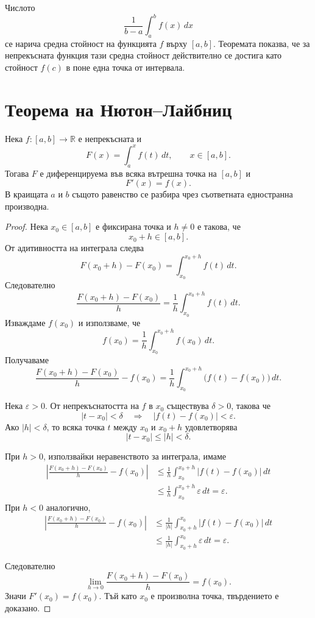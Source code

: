 Числото
\[
\frac{1}{b-a}\int_a^b f(x)\,dx
\]
се нарича средна стойност на функцията $f$ върху $[a,b]$. Теоремата показва, че за непрекъсната функция тази средна стойност действително се достига като стойност $f(c)$ в поне една точка от интервала.

\section{Теорема на Нютон--Лайбниц}\label{s:33.6}

\begin{keythm}
\label{thm:newtonleibniz}
Нека $f\colon[a,b]\to\mathbb{R}$ е непрекъсната и
\[
F(x)=\int_a^x f(t)\,dt,
\qquad x\in[a,b].
\]
Тогава $F$ е диференцируема във всяка вътрешна точка на $[a,b]$ и
\[
F'(x)=f(x).
\]
В краищата $a$ и $b$ същото равенство се разбира чрез съответната едностранна производна.
\end{keythm}

\begin{proof}
Нека $x_0\in[a,b]$ е фиксирана точка и $h\ne0$ е такова, че
\[
x_0+h\in[a,b].
\]
От адитивността на интеграла следва
\[
F(x_0+h)-F(x_0)
=
\int_{x_0}^{x_0+h}f(t)\,dt.
\]
Следователно
\[
\frac{F(x_0+h)-F(x_0)}{h}
=
\frac{1}{h}\int_{x_0}^{x_0+h}f(t)\,dt.
\]
Изваждаме $f(x_0)$ и използваме, че
\[
f(x_0)=\frac{1}{h}\int_{x_0}^{x_0+h}f(x_0)\,dt.
\]
Получаваме
\[
\frac{F(x_0+h)-F(x_0)}{h}-f(x_0)
=
\frac{1}{h}\int_{x_0}^{x_0+h}
\bigl(f(t)-f(x_0)\bigr)\,dt.
\]

Нека $\varepsilon>0$. От непрекъснатостта на $f$ в $x_0$ съществува $\delta>0$, такова че
\[
|t-x_0|<\delta
\quad\Longrightarrow\quad
|f(t)-f(x_0)|<\varepsilon.
\]
Ако $|h|<\delta$, то всяка точка $t$ между $x_0$ и $x_0+h$ удовлетворява
\[
|t-x_0|\leq |h|<\delta.
\]

При $h>0$, използвайки неравенството за интеграла, имаме
\begin{align*}
\left|
\frac{F(x_0+h)-F(x_0)}{h}-f(x_0)
\right|
&\leq
\frac{1}{h}
\int_{x_0}^{x_0+h}|f(t)-f(x_0)|\,dt\\
&\leq
\frac{1}{h}\int_{x_0}^{x_0+h}\varepsilon\,dt
=
\varepsilon.
\end{align*}
При $h<0$ аналогично,
\begin{align*}
\left|
\frac{F(x_0+h)-F(x_0)}{h}-f(x_0)
\right|
&\leq
\frac{1}{|h|}
\int_{x_0+h}^{x_0}|f(t)-f(x_0)|\,dt\\
&\leq
\frac{1}{|h|}
\int_{x_0+h}^{x_0}\varepsilon\,dt
=
\varepsilon.
\end{align*}

Следователно
\[
\lim_{h\to0}
\frac{F(x_0+h)-F(x_0)}{h}
=
f(x_0).
\]
Значи $F'(x_0)=f(x_0)$. Тъй като $x_0$ е произволна точка, твърдението е доказано.
\end{proof}

